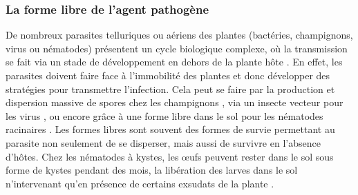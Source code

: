	

\subsubsection{La forme libre de l'agent pathogène}  
\label{sec:libres}
	
	De nombreux parasites telluriques ou aériens des plantes (bactéries, champignons, virus ou nématodes) présentent un cycle biologique complexe, où la transmission se fait via un stade de développement en dehors de la plante hôte \citep{Dwyer1994, Godfray1997}. En effet, les parasites doivent faire face à l’immobilité des plantes et donc développer des stratégies pour transmettre l’infection. Cela peut se faire par la production et dispersion massive de spores chez les champignons \citep{Agrios2005}, via un insecte vecteur pour les virus \citep{Madden2000}, ou encore grâce à une forme libre dans le sol pour les nématodes racinaires \citep{Nilusmas2017}.
Les formes libres sont souvent des formes de survie permettant au parasite non seulement de se disperser, mais aussi de survivre en l'absence d'hôtes. Chez les nématodes à kystes, les œufs peuvent rester dans le sol sous forme de kystes pendant des mois, la libération des larves dans le sol n'intervenant qu'en présence de certains exsudats de la plante \citep{Perry2018}.
	
